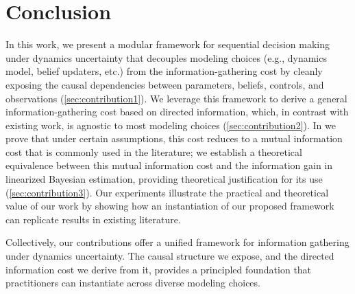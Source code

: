 \section{Conclusion}

In this work, we present a modular framework for sequential decision making under dynamics uncertainty that decouples modeling choices (e.g., dynamics model, belief updaters, etc.) from the information-gathering cost by cleanly exposing the causal dependencies between parameters, beliefs, controls, and observations (\cref{sec:contribution1}). 
We leverage this framework to derive a general information-gathering cost based on directed information, which, in contrast with existing work, is agnostic to most modeling choices (\cref{sec:contribution2}).
In  we prove that under certain assumptions, this cost reduces to a mutual information cost that is commonly used in the literature;
we establish a theoretical equivalence between this mutual information cost and the information gain in linearized Bayesian estimation, providing theoretical justification for its use (\cref{sec:contribution3}).
Our experiments illustrate the practical and theoretical value of our work by showing how an instantiation of our proposed framework can replicate results in existing literature.

Collectively, our contributions offer a unified framework for information gathering under dynamics uncertainty. 
The causal structure we expose, and the directed information cost we derive from it, provides a principled foundation that practitioners can instantiate across diverse modeling choices.


